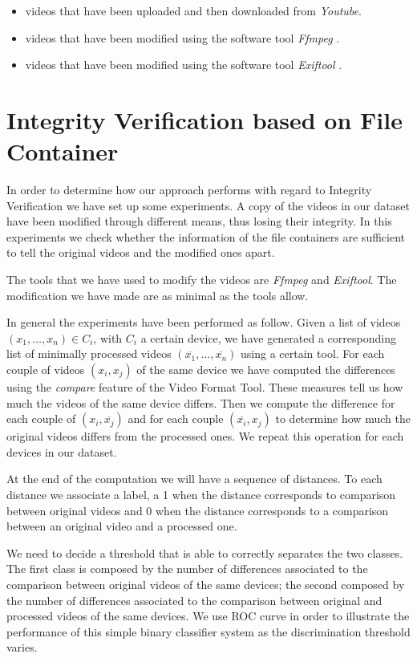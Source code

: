 \begin{itemize}
\item videos that have been uploaded and then downloaded from 	\emph{Youtube}.
\item videos that have been modified using the software tool \emph{Ffmpeg} \cite{ffmpeg}.
\item videos that have been modified using the software tool \emph{Exiftool} \cite{exiftool}.
\end{itemize}

\section{Integrity Verification based on File Container}

In order to determine how our approach performs with regard to Integrity Verification we have set up some experiments. A copy of the videos in our dataset have been modified through different means, thus losing their integrity. In this experiments we check whether the information of the file containers are sufficient to tell the original videos and the modified ones apart.

The tools that we have used to modify the videos are \emph{Ffmpeg} and \emph{Exiftool}. The modification we have made are as minimal as the tools allow.

In general the experiments have been performed as follow. Given a list of videos $(x_{1},\ldots,x_{n}) \in C_{i}$, with $C_{i}$ a certain device, we have generated a corresponding list of minimally processed videos $(\overline{x_{1}},\ldots,\overline{x_{n}})$ using a certain tool. For each couple of videos $(x_{i}, x_{j})$ of the same device we have computed the differences using the \emph{compare} feature of the Video Format Tool. These measures tell us how much the videos of the same device differs. Then we compute the difference for each couple of $(x_{i}, \overline{x_{j}})$ and for each couple $(\overline{x_{i}}, x_{j})$ to determine how much the original videos differs from the processed ones. We repeat this operation for each devices in our dataset.

At the end of the computation we will have a sequence of distances. To each distance we associate a label, a 1 when the distance corresponds to comparison between original videos and 0 when the distance corresponds to a comparison between an original video and a processed one.

We need to decide a threshold that is able to correctly separates the two classes. The first class is composed by the number of differences associated to the comparison between original videos of the same devices; the second composed by the number of differences associated to the comparison between original and processed videos of the same devices. We use ROC curve in order to illustrate the performance of this simple binary classifier system as the discrimination threshold varies.

